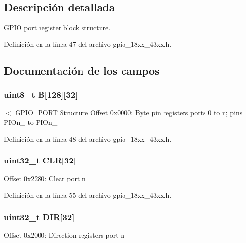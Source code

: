 \subsection{Descripción detallada}
G\+P\+IO port register block structure. 

Definición en la línea 47 del archivo gpio\+\_\+18xx\+\_\+43xx.\+h.



\subsection{Documentación de los campos}
\subsubsection[{\texorpdfstring{B}{B}}]{ uint8\+\_\+t B\mbox{[}128\mbox{]}\mbox{[}32\mbox{]}}\hypertarget{struct_l_p_c___g_p_i_o___t_a057fd7b1589f98e60362632f4bcd1459}{}\label{struct_l_p_c___g_p_i_o___t_a057fd7b1589f98e60362632f4bcd1459}
$<$ G\+P\+I\+O\+\_\+\+P\+O\+RT Structure Offset 0x0000\+: Byte pin registers ports 0 to n; pins P\+I\+On\+\_ to P\+I\+On\+\_ 

Definición en la línea 48 del archivo gpio\+\_\+18xx\+\_\+43xx.\+h.

\subsubsection[{\texorpdfstring{C\+LR}{CLR}}]{ uint32\+\_\+t C\+LR\mbox{[}32\mbox{]}}\hypertarget{struct_l_p_c___g_p_i_o___t_a27030dab6a2024193f0c12b347eaa255}{}\label{struct_l_p_c___g_p_i_o___t_a27030dab6a2024193f0c12b347eaa255}
Offset 0x2280\+: Clear port n 

Definición en la línea 55 del archivo gpio\+\_\+18xx\+\_\+43xx.\+h.

\subsubsection[{\texorpdfstring{D\+IR}{DIR}}]{ uint32\+\_\+t D\+IR\mbox{[}32\mbox{]}}\hypertarget{struct_l_p_c___g_p_i_o___t_a63f44c6126fd4e7a5670a59adb4483dd}{}\label{struct_l_p_c___g_p_i_o___t_a63f44c6126fd4e7a5670a59adb4483dd}
Offset 0x2000\+: Direction registers port n 

